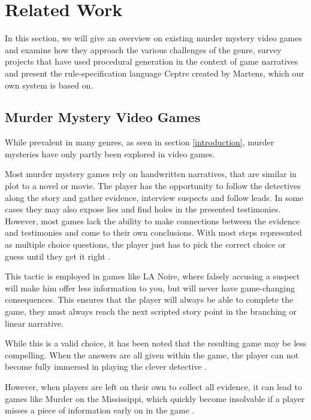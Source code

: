 \section{Related Work} \label{related_work}

In this section, we will give an overview on existing murder mystery video games and examine how they approach the various challenges of the genre, survey projects that have used procedural generation in the context of game narratives and present the rule-specification language Ceptre created by Martens, which our own system is based on.

\subsection{Murder Mystery Video Games}

While prevalent in many genres, as seen in section \ref{introduction}, murder mysteries have only partly been explored in video games.

Most murder mystery games rely on handwritten narratives, that are similar in plot to a novel or movie.
The player has the opportunity to follow the detectives along the story and gather evidence, interview suspects and follow leads.
In some cases they may also expose lies and find holes in the presented testimonies.
However, most games lack the ability to make connections between the evidence and testimonies and come to their own conclusions. With most steps represented as multiple choice questions, the player just has to pick the correct choice or guess until they get it right \cite{brown_2017}. 

This tactic is employed in games like LA Noire, where falsely accusing a suspect will make him offer less information to you, but will never have game-changing consequences.
This ensures that the player will always be able to complete the game, they must always reach the next scripted story point in the branching or linear narrative.

While this is a valid choice, it has been noted that the resulting game may be less compelling.
When the answers are all given within the game, the player can not become fully immersed in playing the clever detective \cite{goldstein_2018}.

However, when players are left on their own to collect all evidence, it can lead to games like Murder on the Mississippi, which quickly become insolvable if a player misses a piece of information early on in the game \cite{petit_2018}.

